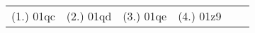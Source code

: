 \begin{eocexercises}{}
\begin{enumerate}
\end{enumerate}


\par \practiceinfo
\par \begin{tabular}[h]{cccccc}
(1.)	01qc	&
(2.)	01qd	&
(3.)	01qe	&

(4.) 01z9 &
\end{tabular}

\end{eocexercises}









